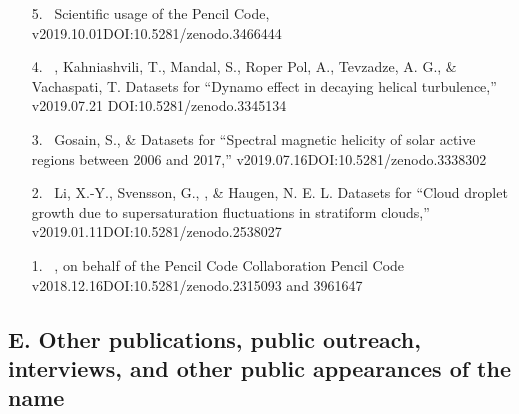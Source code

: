 \begin{itemize}
\item[{5.}~]
\Brandenburg{}
{Scientific usage of the Pencil Code, v2019.10.01}{DOI:10.5281/zenodo.3466444}

\item[{4.}~]
\Brandenburg, Kahniashvili, T., Mandal, S., Roper Pol, A., Tevzadze, A. G., \& Vachaspati, T.
{Datasets for ``Dynamo effect in decaying helical turbulence,'' v2019.07.21}
{DOI:10.5281/zenodo.3345134}

\item[{3.}~]
Gosain, S., \& \Brandenburg{}
{Datasets for ``Spectral magnetic helicity of solar active regions between 2006 and 2017,'' v2019.07.16}{DOI:10.5281/zenodo.3338302}

\item[{2.}~]
Li, X.-Y., Svensson, G., \Brandenburg, \& Haugen, N. E. L.
{Datasets for ``Cloud droplet growth due to supersaturation fluctuations in stratiform clouds,'' v2019.01.11}{DOI:10.5281/zenodo.2538027}

\item[{1.}~]
\Brandenburg, on behalf of the Pencil Code Collaboration
{Pencil Code v2018.12.16}{DOI:10.5281/zenodo.2315093 and 3961647}

\end{itemize}

\subsection*{E. Other publications, public outreach, interviews, and other public appearances of the name}%

